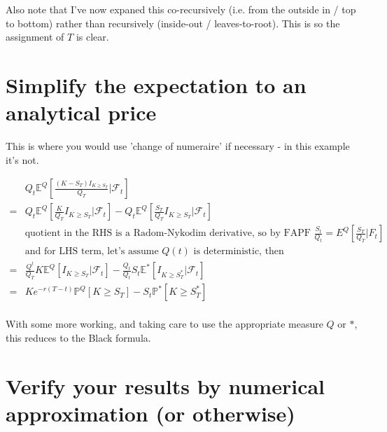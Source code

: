 \documentclass[a4paper]{article}
\begin{document}
Also note that I've now expaned this co-recursively (i.e. from the outside in / top to bottom) rather than recursively (inside-out / leaves-to-root). This is so the assignment of $T$ is clear.

\section{Simplify the expectation to an analytical price}

This is where you would use 'change of numeraire' if necessary - in this example it's not.

\begin{align*}
& Q_t \mathbb{E}^Q[ \frac{  (K - S_T) I_{K \geq S_T} } { Q_T } | \mathcal{F}_t ] \\
= & Q_t \mathbb{E}^Q[ \frac{K} {Q_T} I_{K \geq S_T} | \mathcal{F}_t ] - Q_t \mathbb{E}^Q[ \frac{S_T} {Q_T} I_{K \geq S_T} | \mathcal{F}_t ] \\
& \text{quotient in the RHS is a Radom-Nykodim derivative, so by FAPF $\frac{S_t}{Q_t} = E^Q[\frac{S_T}{Q_T} | F_t]$} \\
& \text{and for LHS term, let's assume $Q(t)$ is deterministic, then} \\
= & \frac{Q^t} {Q_T} K \mathbb{E}^Q[  I_{K \geq S_T} | \mathcal{F}_t ] - \frac{Q_t}{Q_t} S_t \mathbb{E}^{*}[  I_{K \geq S^*_T} | \mathcal{F}_t ] \\
= & K e^{-r(T-t)} \mathbb{P}^Q[K \geq S_T] - S_t \mathbb{P}^{*}[K \geq S^*_T] \\
\end{align*}

With some more working, and taking care to use the appropriate measure $Q$ or $*$, this reduces to the Black formula.

\section{Verify your results by numerical approximation (or otherwise)}
\end{document}
